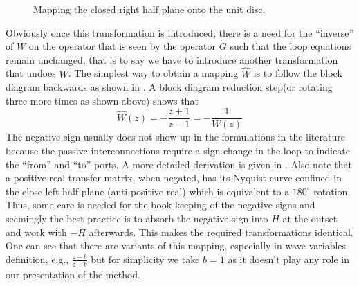 \begin{figure}%
\centering
{}
\caption[Mapping the closed right half plane onto the unit disc.]%
{Mapping the closed right half plane onto the unit disc.}%
\label{fig:lit:smith}%
\end{figure}

Obviously once this transformation is introduced, there is a need for the \enquote{inverse} of $W$ on the operator that is seen
by the operator $G$ such that the loop equations remain unchanged, that is to say we have to introduce another transformation that undoes
$W$. The simplest way to obtain a mapping $\hat{W}$ is to follow the block diagram backwards as shown in 
. A block diagram reduction step(or rotating three more times as shown above) shows that 
\[
\hat{W}(z) = -\frac{z+1}{z-1} = -\frac{1}{W(z)}
\]
The negative sign usually does not show up in the formulations in the literature because the passive interconnections 
require a sign change in the loop to indicate the \enquote{from} and \enquote{to} ports. A more detailed derivation
is given in \cite{colgate3}. Also note that a positive real transfer matrix, when negated, has its Nyquist curve 
confined in the close left half plane (anti-positive real) which is equivalent to a $180^\circ$ rotation. 
Thus, some care is needed for the book-keeping of the negative signs and seemingly the best practice
is to absorb the negative sign into $H$ at the outset and work with $-H$ afterwards. This makes the required
transformations identical. One can see that there are variants of this mapping, especially in wave variables 
definition, e.g., $\frac{z-b}{z+b}$ but for simplicity we take $b=1$ as it doesn't play any role in our 
presentation of the method. 


